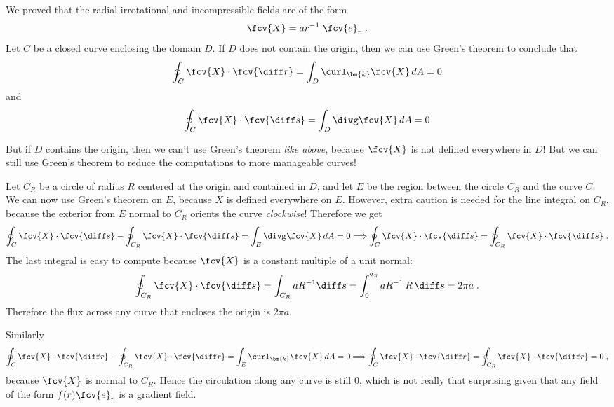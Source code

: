 

\begin{frame}
  \frametitle{}

  We proved that the radial irrotational and incompressible fields are of the form
%
$$\fcv{X} = ar^{-1} \; \fcv{e}_r\; .$$
%
Let $C$ be a closed curve enclosing the domain $D$. If $D$ does not contain the origin, then we can use Green's theorem to conclude that
%
$$\oint_C \fcv{X} \cdot \fcv{\diff r} = \int_D \curl_{\bm{k}} \fcv{X} \, dA = 0$$
%
and
%
$$\oint_C \fcv{X} \cdot \fcv{\diff s} = \int_D \divg \fcv{X} \, dA = 0$$

But if $D$ contains the origin, then we can't use Green's theorem \emph{like above}, because $\fcv{X}$ is not defined everywhere in $D$! But we can still use Green's theorem to reduce the computations to more manageable curves!

Let $C_R$ be a circle of radius $R$ centered at the origin and contained in $D$, and let $E$ be the region between the circle $C_R$ and the curve $C$. We can now use Green's theorem on $E$, because $X$ is defined everywhere on $E$. However, extra caution is needed for the line integral on $C_R$, because the exterior from $E$ normal to $C_R$ orients the curve \emph{clockwise}! Therefore we get
%
$$\oint_C \fcv{X} \cdot \fcv{\diff s} - \oint_{C_R} \fcv{X} \cdot \fcv{\diff s} = \int_E \divg \fcv{X} \, dA = 0 \Longrightarrow \oint_C \fcv{X} \cdot \fcv{\diff s} = \oint_{C_R} \fcv{X} \cdot \fcv{\diff s}\;.$$
%
The last integral is easy to compute because $\fcv{X}$ is a constant multiple of a unit normal:
%
$$\oint_{C_R} \fcv{X} \cdot \fcv{\diff s} = \int_{C_R} aR^{-1} \diff s = \int_{0}^{2\pi} aR^{-1} \, R \, \diff s = 2\pi a \; .$$
%
Therefore the flux across any curve that encloses the origin is $2\pi a$.

Similarly
%
%
$$\oint_C \fcv{X} \cdot \fcv{\diff r} - \oint_{C_R} \fcv{X} \cdot \fcv{\diff r} = \int_E \curl_{\bm{k}} \fcv{X} \, dA = 0 \Longrightarrow \oint_C \fcv{X} \cdot \fcv{\diff r} = \oint_{C_R} \fcv{X} \cdot \fcv{\diff r} = 0\;,$$
%
because $\fcv{X}$ is normal to $C_R$. Hence the circulation along any curve is still 0, which is not really that surprising given that any field of the form $f(r)\fcv{e}_r$ is a gradient field.
\end{frame}
